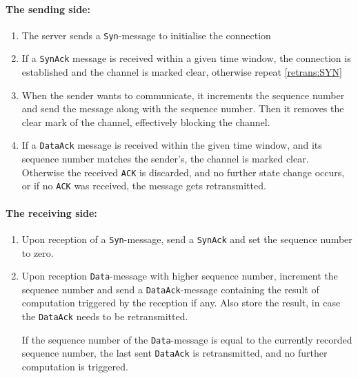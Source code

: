 \paragraph{The sending side:}
\begin{enumerate}

\item \label{retrans:SYN}
The server sends a \texttt{Syn}-message to initialise the connection

\item If a \texttt{SynAck} message is received within a given time window, the
connection is established and the channel is marked clear, otherwise repeat \ref{retrans:SYN}

\item \label{retrans:Send} When the sender wants to communicate, it increments
the sequence number and send the message along with the sequence number. Then it
removes the clear mark of the channel, effectively blocking the channel.

\item If a \texttt{DataAck} message is received within the given time window,
and its sequence number matches the sender's, the channel is marked clear.
Otherwise the received \texttt{ACK} is discarded, and no further state change
occurs, or if no \texttt{ACK} was received, the message gets retransmitted.

\end{enumerate} \paragraph{The receiving side:} \begin{enumerate}

\item Upon reception of a \texttt{Syn}-message, send a \texttt{SynAck} and set
the sequence number to zero.

\item Upon reception \texttt{Data}-message with higher sequence number,
increment the sequence number and send a \texttt{DataAck}-message containing the
result of computation triggered by the reception if any. Also store the result,
in case the \texttt{DataAck} needs to be retransmitted.

If the sequence number of the \texttt{Data}-message is equal to the currently
recorded sequence number, the last sent \texttt{DataAck} is retransmitted, and
no further computation is triggered.

\end{enumerate}

